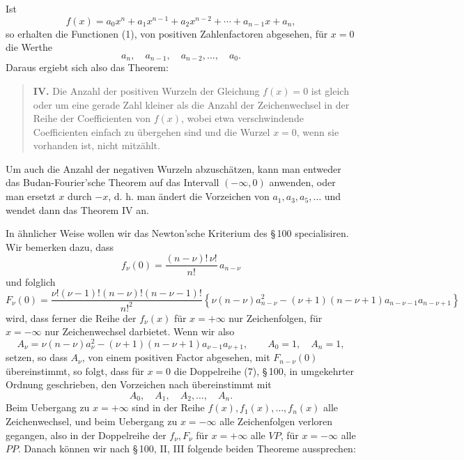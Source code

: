 \documentclass[11pt]{article}
\begin{document}
Ist
\[
        f(x)=a_0x^n+a_1x^{n-1}+a_2x^{n-2}+\cdots+a_{n-1}x+a_n,
\]
so erhalten die Functionen (1), von positiven Zahlenfactoren abgesehen, für $x=0$ die Werthe
\begin{equation}
        a_n,\quad a_{n-1},\quad a_{n-2},\ldots,\quad a_0.
\tag{2}
\end{equation}
Daraus ergiebt sich also das Theorem:

\begin{quote}
\textbf{IV.} Die Anzahl der positiven Wurzeln der Gleichung $f(x)=0$ ist gleich oder um eine gerade Zahl kleiner als die Anzahl der Zeichenwechsel in der Reihe der Coefficienten von $f(x)$, wobei etwa verschwindende Coefficienten einfach zu übergehen sind und die Wurzel $x=0$, wenn sie vorhanden ist, nicht mitzählt.
\end{quote}

Um auch die Anzahl der negativen Wurzeln abzuschätzen, kann man entweder das Budan-Fourier'sche Theorem auf das Intervall $(-\infty,0)$ anwenden, oder man ersetzt $x$ durch $-x$, d. h. man ändert die Vorzeichen von $a_1,a_3,a_5,\ldots$ und wendet dann das Theorem IV an.

In ähnlicher Weise wollen wir das Newton'sche Kriterium des \S\,100 specialisiren. Wir bemerken dazu, dass
\[
        f_\nu(0)=\frac{(n-\nu)!\,\nu!}{n!}\,a_{n-\nu}
\]
und folglich
\[
F_\nu(0)=
\frac{\nu!(\nu-1)!(n-\nu)!(n-\nu-1)!}{n!^2}
\left\{\nu(n-\nu)a_{n-\nu}^2
-(\nu+1)(n-\nu+1)a_{n-\nu-1}a_{n-\nu+1}\right\}
\]
wird, dass ferner die Reihe der $f_\nu(x)$ für $x=+\infty$ nur Zeichenfolgen, für $x=-\infty$ nur Zeichenwechsel darbietet. Wenn wir also
\begin{equation}
        A_\nu=\nu(n-\nu)a_\nu^2-(\nu+1)(n-\nu+1)a_{\nu-1}a_{\nu+1},
        \qquad A_0=1,\quad A_n=1,
\tag{3}
\end{equation}
setzen, so dass $A_\nu$, von einem positiven Factor abgesehen, mit $F_{n-\nu}(0)$ übereinstimmt, so folgt, dass für $x=0$ die Doppelreihe (7), \S\,100, in umgekehrter Ordnung geschrieben, den Vorzeichen nach übereinstimmt mit
\begin{equation}
        A_0,\quad A_1,\quad A_2,\ldots,\quad A_n.
\tag{4}
\end{equation}
Beim Uebergang zu $x=+\infty$ sind in der Reihe $f(x),f_1(x),\ldots,f_n(x)$ alle Zeichenwechsel, und beim Uebergang zu $x=-\infty$ alle Zeichenfolgen verloren gegangen, also in der Doppelreihe der $f_\nu,F_\nu$ für $x=+\infty$ alle $VP$, für $x=-\infty$ alle $PP$. Danach können wir nach \S\,100, II, III folgende beiden Theoreme aussprechen:
\end{document}
